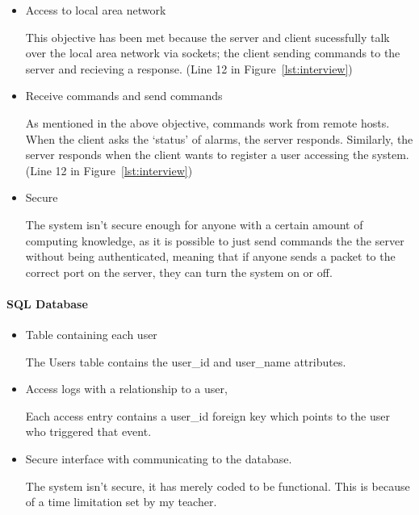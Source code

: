 \documentclass[a4paper]{article}
\begin{document}
			\begin{itemize}
				\item Access to local area network
                    
                    This objective has been met because the server and client sucessfully talk over the local area network
                    via sockets; the client sending commands to the server and recieving a response. (Line 12 in Figure~\ref{lst:interview})

				\item Receive commands and send commands
                    
                    As mentioned in the above objective, commands work from remote hosts. When the client asks the `status' of
                    alarms, the server responds. Similarly, the server responds when the client wants to register a user 
                    accessing the system. (Line 12 in Figure~\ref{lst:interview})

				\item Secure
                    
                    The system isn't secure enough for anyone with a certain amount of computing knowledge, as it is possible to
                    just send commands the the server without being authenticated, meaning that if anyone sends a packet to the
                    correct port on the server, they can turn the system on or off.

			\end{itemize}

		\paragraph{SQL Database}
		
			\begin{itemize}
				\item Table containing each user

					The Users table contains the user\_id and user\_name attributes.

				\item Access logs with a relationship to a user,

					Each access entry contains a user\_id foreign key which points to the user who triggered that event.

				\item Secure interface with communicating to the database.

					The system isn't secure, it has merely coded to be functional. This is because of a time limitation set by my teacher.

			\end{itemize}
\end{document}
